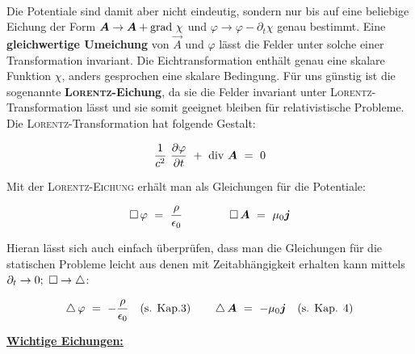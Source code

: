 \ \\

Die Potentiale sind damit aber nicht eindeutig, sondern nur bis auf eine beliebige Eichung der Form $\bm{A}\rightarrow\bm{A}+\text{grad }\chi$ und $\varphi \rightarrow\varphi-\partial_t\chi$ genau bestimmt. Eine \textbf{gleichwertige Umeichung} von $\vec{A}$ und $\varphi$ lässt die Felder unter solche einer Transformation invariant. Die Eichtransformation enthält genau eine skalare Funktion $\chi$, anders gesprochen eine skalare Bedingung. Für uns günstig ist die sogenannte \textbf{\textsc{Lorentz}-Eichung}, da sie die Felder invariant unter \textsc{Lorentz}-Transformation lässt und sie somit geeignet bleiben für relativistische Probleme. Die \textsc{Lorentz}-Transformation hat folgende Gestalt:

\begin{equation*}
\frac{1}{c^2} \ \pdiff{\varphi}{t} \ + \ \div \vec{A}  \ = \ 0
\end{equation*} 

Mit der \textsc{Lorentz-Eichung} erhält man als Gleichungen für die Potentiale:

\begin{equation*}
\Dalembert\varphi  \ = \ \frac{\rho}{\epsilon_0}	\qquad  \qquad		\Dalembert\vec{A}  \ = \ \mu_0\vec{j} 
\end{equation*}

Hieran lässt sich auch einfach überprüfen, dass man die Gleichungen für die statischen Probleme leicht aus denen mit Zeitabhängigkeit erhalten kann mittels $\partial_t \rightarrow 0; \ \mathop{{}\Box}\nolimits \rightarrow \mathop{{}\bigtriangleup}\nolimits$:

\begin{equation*}
\laplace\varphi  \ = \ -\frac{\rho}{\epsilon_0} \quad\text{(s. Kap.3)} \qquad	\laplace\vec{A} \ = \ -\mu_0\vec{j} \quad\text{(s. Kap. 4)} 	
\end{equation*}

\newpage
\underline{\textbf{Wichtige Eichungen:}}

